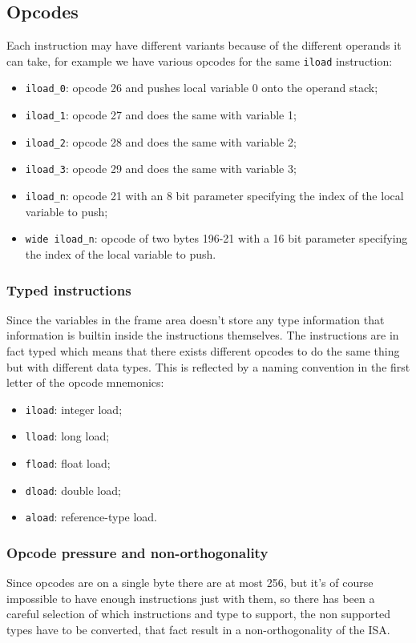 \subsection{Opcodes}
Each instruction may have different variants because of the different operands it can take, for example we have various opcodes for the same \verb|iload| instruction:
\begin{itemize}
    \item \verb|iload_0|: opcode 26 and pushes local variable 0 onto the operand stack;
    \item \verb|iload_1|: opcode 27 and does the same with variable 1;
    \item \verb|iload_2|: opcode 28 and does the same with variable 2;
    \item \verb|iload_3|: opcode 29 and does the same with variable 3;
    \item \verb|iload_n|: opcode 21 with an 8 bit parameter specifying the index of the local variable to push;
    \item \verb|wide iload_n|: opcode of two bytes 196-21 with a 16 bit parameter specifying the index of the local variable to push.
\end{itemize}

\subsubsection{Typed instructions}
Since the variables in the frame area doesn't store any type information that information is builtin inside the instructions themselves.
The instructions are in fact typed which means that there exists different opcodes to do the same thing but with different data types.
This is reflected by a naming convention in the first letter of the opcode mnemonics:
\begin{itemize}
    \item \verb|iload|: integer load;
    \item \verb|lload|: long load;
    \item \verb|fload|: float load;
    \item \verb|dload|: double load;
    \item \verb|aload|: reference-type load.
\end{itemize}

\subsubsection{Opcode pressure and non-orthogonality}
Since opcodes are on a single byte there are at most 256, but it's of course impossible to have enough instructions just with them, so there has been a careful selection of which instructions and type to support, the non supported types have to be converted, that fact result in a non-orthogonality of the ISA.

